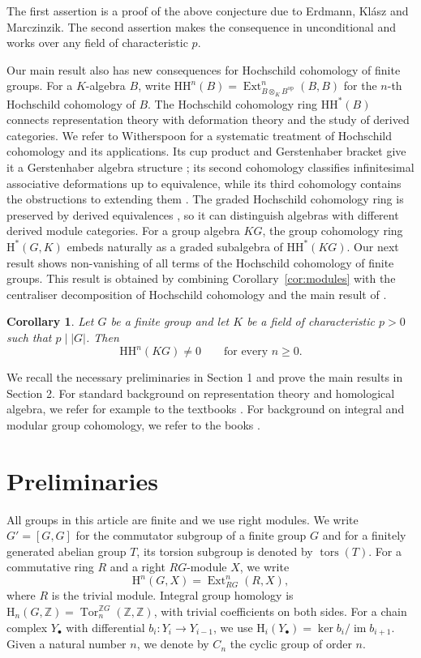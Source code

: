 \documentclass[11pt,a4paper]{amsart}
\newtheorem{corintroduction}[thmintroduction]{Corollary}
\numberwithin{equation}{section}
\DeclareMathOperator{\Ext}{Ext}
\DeclareMathOperator{\im}{im}
\newcommand{\HH}{\mathrm H}
\newcommand{\Hoch}{\mathrm{HH}}
\newcommand{\Z}{\mathbb Z}
\begin{document}
The first assertion is a proof of the above 
conjecture due to Erdmann, Kl\'asz and Marczinzik. The second assertion makes the consequence in \cite[Proposition 2.12]{EKM} unconditional and works over any field of characteristic $p$.

Our main result also has new consequences for Hochschild cohomology of finite groups. For a
$K$-algebra $B$, write
$\Hoch^n(B)=\Ext^n_{B\otimes_K B^{\mathrm{op}}}(B,B)$ for the $n$-th Hochschild cohomology of $B$.
The Hochschild cohomology ring $\Hoch^*(B)$ connects representation
theory with deformation theory and the study of derived categories.
We refer to Witherspoon \cite{Wit} for a systematic treatment of
Hochschild cohomology and its applications.
Its cup product and Gerstenhaber bracket give it a Gerstenhaber
algebra structure \cite{Ger63}; its second cohomology classifies
infinitesimal associative deformations up to equivalence, while its
third cohomology contains the obstructions to extending them \cite{Ger64}.
The graded Hochschild cohomology ring is preserved by derived equivalences \cite{Ric},
so it can distinguish algebras with different derived module
categories. For a group algebra $KG$, the group cohomology ring
$\HH^*(G,K)$ embeds naturally as a graded subalgebra of
$\Hoch^*(KG)$. 
Our next result shows non-vanishing of all terms of the Hochschild cohomology of finite groups.
This result is obtained by combining Corollary~\ref{cor:modules} with the centraliser decomposition of Hochschild cohomology and the main result of \cite{FJL}.


\begin{corintroduction}\label{cor:hochschild}
Let $G$ be a finite group and let $K$ be a field of characteristic
$p>0$ such that $p\mid|G|$. Then
\[
 \Hoch^n(KG)\neq0\qquad\text{for every }n\geq0.
\]
\end{corintroduction}
We recall the necessary preliminaries in Section 1 and prove the main results in Section 2. 
For standard background on representation theory and homological
algebra, we refer for example to the textbooks  \cite{Ben,Ben2,Rot,Wei,Zim}. For background on integral and modular group cohomology, we refer
to the books \cite{AM,Ben,Ben2,Bro,CTVZ}.


\section{Preliminaries}
\newtheorem{lemma}[theorem]{Lemma}
\newtheorem{proposition}[theorem]{Proposition}
\theoremstyle{definition}
\newtheorem{definition}[theorem]{Definition}
\theoremstyle{plain}
All groups in this article are finite and we use right modules. We write $G'=[G,G]$ for the commutator subgroup of a finite group $G$ and for a finitely generated abelian group $T$, its torsion subgroup
is denoted by $\operatorname{tors}(T)$. For a commutative ring $R$
and a right $RG$-module $X$, we write
\[
 \HH^n(G,X)=\Ext^n_{RG}(R,X),
\]
where $R$ is the trivial module. Integral group homology is
$\HH_n(G,\Z)=\operatorname{Tor}^{\Z G}_n(\Z,\Z)$, with
trivial coefficients on both sides. For a chain complex
$Y_\bullet$ with differential $b_i:Y_i\to Y_{i-1}$, we use
$\HH_i(Y_\bullet)=\ker b_i/\im b_{i+1}$. Given a natural number $n$, we denote by $C_n$ the cyclic group of order $n$.
\end{document}
